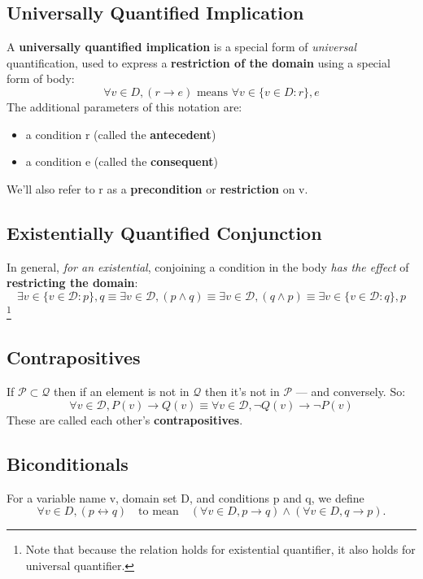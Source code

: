 \documentclass{article}
\begin{document}
\subsection{Universally Quantified Implication}
A \textbf{universally quantified implication} is a special form of \textit{universal} quantification, used to express a \textbf{restriction of the domain}
using a special form of body:
\[
\forall v\in D, (r\rightarrow e)\text{ means }\forall v \in \{v\in D: r\}, e
\]
The additional parameters of this notation are:
\begin{itemize}
\item a condition r (called the \textbf{antecedent})
\item a condition e (called the \textbf{consequent})
\end{itemize}
We’ll also refer to r as a \textbf{precondition} or \textbf{restriction} on v.

\subsection{Existentially Quantified Conjunction}
In general, \textit{for an existential}, conjoining a condition in the body \textit{has the effect} of \textbf{restricting the domain}:
\[
\exists v\in \{v\in \mathcal{D}:p\},q \equiv \exists v\in \mathcal{D},(p\wedge q)\equiv \exists v\in \mathcal{D},(q\wedge p) \equiv \exists v\in \{v\in \mathcal{D}:q\},p
\]\footnote{Note that because the relation holds for existential quantifier, it also holds for universal quantifier.}

\subsection{Contrapositives}

If $\mathcal{P} \subset \mathcal{Q}$ then if an element is not in $\mathcal{Q}$ then it’s not in $\mathcal{P}$ — and conversely. So:
\[
\forall v\in\mathcal{D},P(v)\rightarrow Q(v) \equiv \forall v\in\mathcal{D},\neg Q(v)\rightarrow\neg P(v)
\]
These are called each other’s \textbf{contrapositives}.

\subsection{Biconditionals}
For a variable name v, domain set D, and conditions p and q, we define
\[
\forall v \in D, (p \leftrightarrow q) \quad\text{to mean} \quad (\forall v \in D, p \rightarrow q) \wedge (\forall v \in D, q \rightarrow p) .
\]
\end{document}
